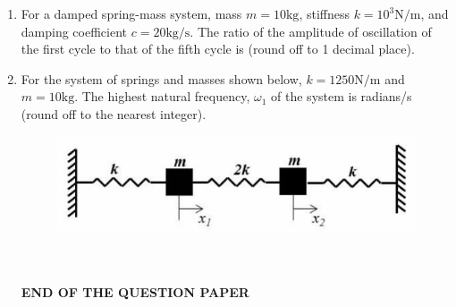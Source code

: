 \documentclass{article}
\begin{document}
\begin{enumerate}[leftmargin=*, resume]
\item For a damped spring-mass system, mass \( m = 10  \text{kg} \), stiffness \( k = 10^3  \text{N/m} \), and damping coefficient \( c = 20  \text{kg/s} \). The ratio of the amplitude of oscillation of the first cycle to that of the fifth cycle is \underline{\hspace{1.5cm}} (round off to 1 decimal place).

\item For the system of springs and masses shown below, \( k = 1250  \text{N/m} \) and \( m = 10  \text{kg} \). The highest natural frequency, \( \omega_1 \) of the system is \underline{\hspace{1.5cm}} radians/s (round off to the nearest integer).
\begin{figure}[H]
    \centering
    \includegraphics[width=0.3\linewidth]{figs/q62.png}
    \caption{}
    \label{fig:q62}
\end{figure}\\
\\
\centering
\large
\textbf{END OF THE QUESTION PAPER}

\end{enumerate}
\end{document}
